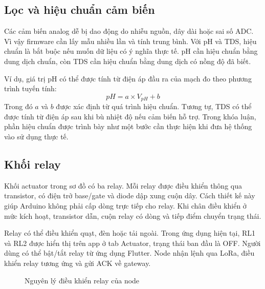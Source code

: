 \subsection{Lọc và hiệu chuẩn cảm biến}
Các cảm biến analog dễ bị dao động do nhiễu nguồn, dây dài hoặc sai số ADC. Vì vậy firmware cần lấy mẫu nhiều lần và tính trung bình. Với pH và TDS, hiệu chuẩn là bắt buộc nếu muốn dữ liệu có ý nghĩa thực tế. pH cần hiệu chuẩn bằng dung dịch chuẩn, còn TDS cần hiệu chuẩn bằng dung dịch có nồng độ đã biết.

Ví dụ, giá trị pH có thể được tính từ điện áp đầu ra của mạch đo theo phương trình tuyến tính:
\[
pH = a \times V_{pH} + b
\]
Trong đó $a$ và $b$ được xác định từ quá trình hiệu chuẩn. Tương tự, TDS có thể được tính từ điện áp sau khi bù nhiệt độ nếu cảm biến hỗ trợ. Trong khóa luận, phần hiệu chuẩn được trình bày như một bước cần thực hiện khi đưa hệ thống vào sử dụng thực tế.

\subsection{Khối relay}
Khối actuator trong sơ đồ có ba relay. Mỗi relay được điều khiển thông qua transistor, có điện trở base/gate và diode dập xung cuộn dây. Cách thiết kế này giúp Arduino không phải cấp dòng trực tiếp cho relay. Khi chân điều khiển ở mức kích hoạt, transistor dẫn, cuộn relay có dòng và tiếp điểm chuyển trạng thái.

Relay có thể điều khiển quạt, đèn hoặc tải ngoài. Trong ứng dụng hiện tại, RL1 và RL2 được hiển thị trên app ở tab Actuator, trạng thái ban đầu là OFF. Người dùng có thể bật/tắt relay từ ứng dụng Flutter. Node nhận lệnh qua LoRa, điều khiển relay tương ứng và gửi ACK về gateway.

\begin{figure}[h!]
    \centering
    \caption{Nguyên lý điều khiển relay của node}
    \label{fig:relay_control}
\end{figure}


